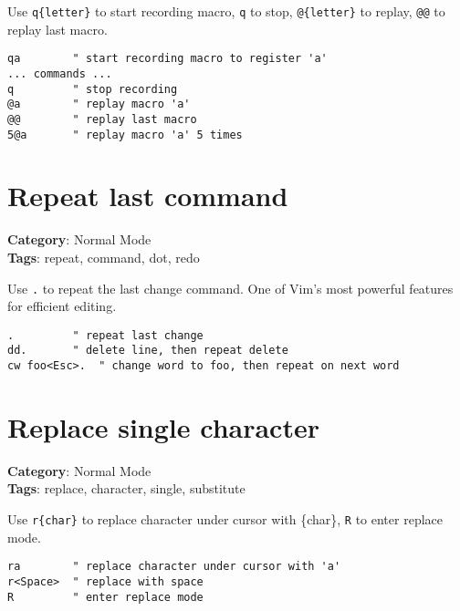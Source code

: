 {{{{{{{{{Use {\footnotesize \Verb§q{letter}§} to start recording macro, {\footnotesize \Verb§q§} to stop, {\footnotesize \Verb§@{letter}§} to replay, {\footnotesize \Verb§@@§} to replay last macro.

\begin{Exa*}{}
\begin{Verbatim}[fontsize=\footnotesize, breaklines, breakanywhere]
qa        " start recording macro to register 'a'
... commands ...
q         " stop recording
@a        " replay macro 'a'
@@        " replay last macro
5@a       " replay macro 'a' 5 times
\end{Verbatim}
\end{Exa*}

\section{Repeat last command}

\textbf{Category}: Normal Mode\\ \textbf{Tags}: repeat, command, dot, redo
\vspace{0.5cm}

Use {\footnotesize \Verb§.§} to repeat the last change command. One of Vim's most powerful features for efficient editing.

\begin{Exa*}{}
\begin{Verbatim}[fontsize=\footnotesize, breaklines, breakanywhere]
.         " repeat last change
dd.       " delete line, then repeat delete
cw foo<Esc>.  " change word to foo, then repeat on next word
\end{Verbatim}
\end{Exa*}

\section{Replace single character}

\textbf{Category}: Normal Mode\\ \textbf{Tags}: replace, character, single, substitute
\vspace{0.5cm}

Use {\footnotesize \Verb§r{char}§} to replace character under cursor with \{char\}, {\footnotesize \Verb§R§} to enter replace mode.

\begin{Exa*}{}
\begin{Verbatim}[fontsize=\footnotesize, breaklines, breakanywhere]
ra        " replace character under cursor with 'a'
r<Space>  " replace with space
R         " enter replace mode
\end{Verbatim}
\end{Exa*}

}}}}}}}}}
